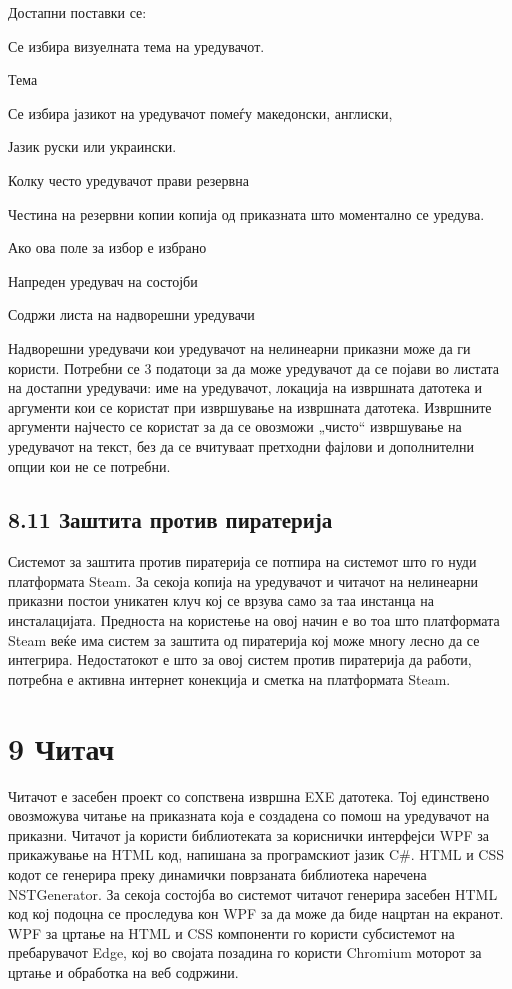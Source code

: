 Достапни поставки се:

Се избира визуелната тема на уредувачот.

Тема

Се избира јазикот на уредувачот помеѓу македонски, англиски,

Јазик руски или украински.

Колку често уредувачот прави резервна

Честина на резервни копии копија од приказната што моментално се уредува.


Ако ова поле за избор е избрано

Напреден уредувач на состојби

Содржи листа на надворешни уредувачи

Надворешни уредувачи кои уредувачот на нелинеарни приказни може да ги користи. Потребни се 3 податоци за да може уредувачот да се појави во листата на достапни уредувачи: име на уредувачот, локација на извршната датотека и аргументи кои се користат при извршување на извршната датотека. Извршните аргументи најчесто се користат за да се овозможи „чисто“ извршување на уредувачот на текст, без да се вчитуваат претходни фајлови и дополнителни опции кои не се потребни.

\subsection{8.11 Заштита против пиратерија}

Системот за заштита против пиратерија се потпира на системот што го нуди платформата Steam. За секоја копија на уредувачот и читачот на нелинеарни приказни постои уникатен клуч кој се врзува само за таа инстанца на инсталацијата. Предноста на користење на овој начин е во тоа што платформата Steam веќе има систем за заштита од пиратерија кој може многу лесно да се интегрира. Недостатокот е што за овој систем против пиратерија да работи, потребна е активна интернет конекција и сметка на платформата Steam.

\section{9 Читач}

Читачот е засебен проект со сопствена извршна EXE датотека. Тој единствено овозможува читање на приказната која е создадена со помош на уредувачот на приказни. Читачот ја користи библиотеката за кориснички интерфејси WPF за прикажување на HTML код, напишана за програмскиот јазик C\#. HTML и CSS кодот се генерира преку динамички поврзаната библиотека наречена NSTGenerator. За секоја состојба во системот читачот генерира засебен HTML код кој подоцна се проследува кон WPF за да може да биде нацртан на екранот. WPF за цртање на HTML и CSS компоненти го користи субсистемот на пребарувачот Edge, кој во својата позадина го користи Chromium моторот за цртање и обработка на веб содржини.

